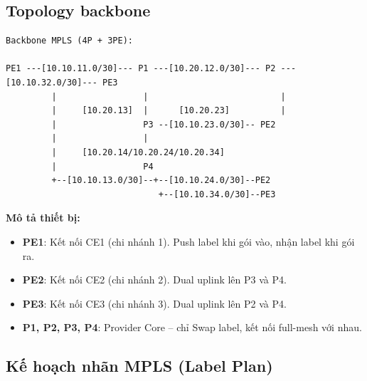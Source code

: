 \subsection{Topology backbone}

\begin{Verbatim}[fontsize=\small, frame=single]
Backbone MPLS (4P + 3PE):

PE1 ---[10.10.11.0/30]--- P1 ---[10.20.12.0/30]--- P2 ---[10.10.32.0/30]--- PE3
         |                 |                          |
         |     [10.20.13]  |      [10.20.23]          |
         |                 P3 --[10.10.23.0/30]-- PE2
         |                 |
         |     [10.20.14/10.20.24/10.20.34]
         |                 P4
         +--[10.10.13.0/30]--+--[10.10.24.0/30]--PE2
                              +--[10.10.34.0/30]--PE3
\end{Verbatim}

\textbf{Mô tả thiết bị:}
\begin{itemize}
    \item \textbf{PE1}: Kết nối CE1 (chi nhánh 1). Push label khi gói vào, nhận label khi gói ra.
    \item \textbf{PE2}: Kết nối CE2 (chi nhánh 2). Dual uplink lên P3 và P4.
    \item \textbf{PE3}: Kết nối CE3 (chi nhánh 3). Dual uplink lên P2 và P4.
    \item \textbf{P1, P2, P3, P4}: Provider Core -- chỉ Swap label, kết nối full-mesh với nhau.
\end{itemize}

\subsection{Kế hoạch nhãn MPLS (Label Plan)}

